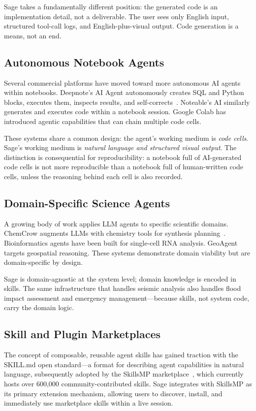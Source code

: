 \documentclass[10pt,twocolumn]{article}
\begin{document}
Sage takes a fundamentally different position: the generated code is an implementation detail, not a deliverable. The user sees only English input, structured tool-call logs, and English-plus-visual output. Code generation is a means, not an end.

\subsection{Autonomous Notebook Agents}

Several commercial platforms have moved toward more autonomous AI agents within notebooks. Deepnote's AI Agent autonomously creates SQL and Python blocks, executes them, inspects results, and self-corrects~\cite{deepnote}. Noteable's AI similarly generates and executes code within a notebook session. Google Colab has introduced agentic capabilities that can chain multiple code cells.

These systems share a common design: the agent's working medium is \emph{code cells}. Sage's working medium is \emph{natural language and structured visual output}. The distinction is consequential for reproducibility: a notebook full of AI-generated code cells is not more reproducible than a notebook full of human-written code cells, unless the reasoning behind each cell is also recorded.

\subsection{Domain-Specific Science Agents}

A growing body of work applies LLM agents to specific scientific domains. ChemCrow augments LLMs with chemistry tools for synthesis planning~\cite{chemcrow}. Bioinformatics agents have been built for single-cell RNA analysis. GeoAgent targets geospatial reasoning. These systems demonstrate domain viability but are domain-specific by design.

Sage is domain-agnostic at the system level; domain knowledge is encoded in skills. The same infrastructure that handles seismic analysis also handles flood impact assessment and emergency management---because skills, not system code, carry the domain logic.

\subsection{Skill and Plugin Marketplaces}

The concept of composable, reusable agent skills has gained traction with the SKILL.md open standard---a format for describing agent capabilities in natural language, subsequently adopted by the SkillsMP marketplace~\cite{skillsmp}, which currently hosts over 600,000 community-contributed skills. Sage integrates with SkillsMP as its primary extension mechanism, allowing users to discover, install, and immediately use marketplace skills within a live session.
\end{document}
